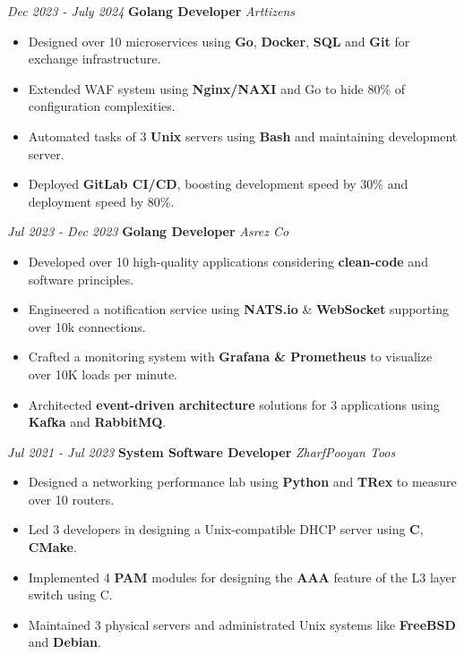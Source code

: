 \documentclass{engineercv}
\begin{document}
\begin{twocolentry}{\textit{Dec 2023 - July 2024}}
  \textbf{Golang Developer}
  \textit{Arttizens}
\end{twocolentry}

\begin{itemize}
  \item Designed over 10 microservices using \textbf{Go}, \textbf{Docker}, \textbf{SQL} and \textbf{Git} for exchange infrastructure.
  \item Extended WAF system using \textbf{Nginx/NAXI} and Go to hide 80\% of configuration complexities.
  \item Automated tasks of 3 \textbf{Unix} servers using \textbf{Bash} and maintaining development server.
  \item Deployed \textbf{GitLab CI/CD}, boosting development speed by 30\% and deployment speed by 80\%.
\end{itemize}

\begin{twocolentry}{\textit{Jul 2023 - Dec 2023}}
  \textbf{Golang Developer}
  \textit{Asrez Co}
\end{twocolentry}

\begin{itemize}
  \item Developed over 10 high-quality applications considering \textbf{clean-code} and software principles.
  \item Engineered a notification service using \textbf{NATS.io} \& \textbf{WebSocket} supporting over 10k connections.
  \item Crafted a monitoring system with \textbf{Grafana \& Prometheus} to visualize over 10K loads per minute.
  \item Architected \textbf{event-driven architecture} solutions for 3 applications using \textbf{Kafka} and \textbf{RabbitMQ}.
\end{itemize}

\begin{twocolentry}{\textit{Jul 2021 - Jul 2023}}
  \textbf{System Software Developer}
  \textit{ZharfPooyan Toos}
\end{twocolentry}

\begin{itemize}
  \item Designed a networking performance lab using \textbf{Python} and \textbf{TRex} to measure over 10 routers.
  \item Led 3 developers in designing a Unix-compatible DHCP server using \textbf{C}, \textbf{CMake}.
  \item Implemented 4 \textbf{PAM} modules for designing the \textbf{AAA} feature of the L3 layer switch using C.
  \item Maintained 3 physical servers and administrated Unix systems like \textbf{FreeBSD} and \textbf{Debian}.
\end{itemize}
\end{document}
